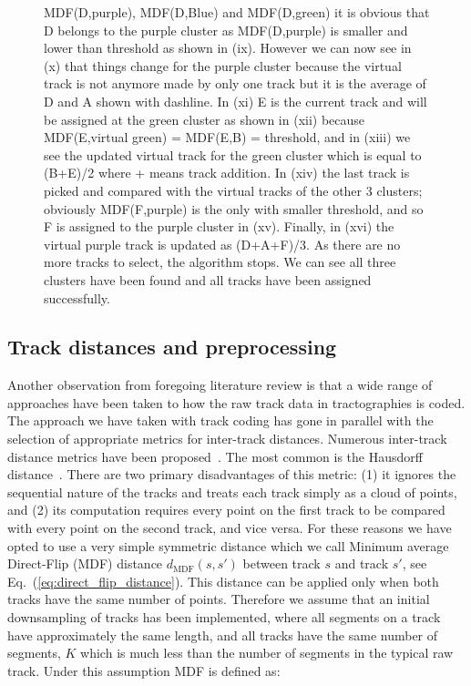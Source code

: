 \documentclass[preprint,authoryear,a4paper,10pt,onecolumn]{elsarticle}
\begin{document}
\begin{figure}
{  MDF(D,purple), MDF(D,Blue) and MDF(D,green) it is obvious that D
  belongs to the purple cluster as MDF(D,purple) is smaller and lower
  than threshold as shown in (ix). However we can now see in (x) that
  things change for the purple cluster because the virtual track is not
  anymore made by only one track but it is the average of D and A shown
  with dashline. In (xi) E is the current track and will be assigned at
  the green cluster as shown in (xii) because MDF(E,virtual green) =
  MDF(E,B) = threshold, and in (xiii) we see the updated virtual track
  for the green cluster which is equal to (B+E)/2 where + means track
  addition. In (xiv) the last track is picked and compared with the
  virtual tracks of the other 3 clusters; obviously MDF(F,purple) is the
  only with smaller threshold, and so F is assigned to the purple
  cluster in (xv). Finally, in (xvi) the virtual purple track is updated
  as (D+A+F)/3. As there are no more tracks to select, the algorithm
  stops. We can see all three clusters have been found and all tracks
  have been assigned successfully.\label{Fig:LSC_simple}}
\end{figure}

\subsection{\label{sub:track-distances}Track distances and preprocessing}

Another observation from foregoing literature review is that a wide
range of approaches have been taken to how the raw track data in
tractographies is coded. The approach we have taken with track coding
has gone in parallel with the selection of appropriate metrics for
inter-track distances.  Numerous inter-track distance metrics have been
proposed~\citep{Ding2003, MaddahIPMI2007, zhang2005dti}. The most common
is the Hausdorff distance~\citep[and many other
studies]{corouge2004towards}. There are two primary disadvantages of
this metric: (1) it ignores the sequential nature of the tracks and
treats each track simply as a cloud of points, and (2) its computation
requires every point on the first track to be compared with every point
on the second track, and vice versa. For these reasons we have opted to
use a very simple symmetric distance \citep{EGMB10, Visser2010} which we
call Minimum average Direct-Flip (MDF) distance
$d_{\textrm{MDF}}(s,s')$ between track $s$ and track $s'$,
see Eq.~(\ref{eq:direct_flip_distance}). This distance can be applied
only when both tracks have the same number of points. Therefore we
assume that an initial downsampling of tracks has been implemented,
where all segments on a track have approximately the same length, and
all tracks have the same number of segments, $K$ which is much less than
the number of segments in the typical raw track. Under this assumption
MDF is defined as:
\end{document}
